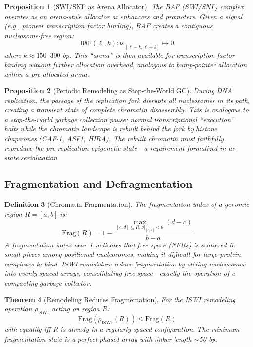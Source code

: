 \documentclass[12pt,a4paper]{article}
\newtheorem{theorem}{Theorem}[section]
\newtheorem{proposition}[theorem]{Proposition}
\newtheorem{definition}[theorem]{Definition}
\newcommand{\eg}{\textit{e.g.}}
\begin{document}
\begin{proposition}[SWI/SNF as Arena Allocator]
\label{prop:swi-snf}
The BAF (SWI/SNF) complex operates as an arena-style allocator at enhancers and promoters. Given a signal (\eg, pioneer transcription factor binding), BAF creates a contiguous nucleosome-free region:
\[
    \texttt{BAF}(\ell, k) : \nu|_{[\ell-k, \ell+k]} \mapsto 0
\]
where $k \approx 150\text{--}300$ bp. This ``arena'' is then available for transcription factor binding without further allocation overhead, analogous to bump-pointer allocation within a pre-allocated arena.
\end{proposition}

\begin{proposition}[Periodic Remodeling as Stop-the-World GC]
\label{prop:stop-world}
During DNA replication, the passage of the replication fork disrupts all nucleosomes in its path, creating a transient state of complete chromatin disassembly. This is analogous to a stop-the-world garbage collection pause: normal transcriptional ``execution'' halts while the chromatin landscape is rebuilt behind the fork by histone chaperones (CAF-1, ASF1, HIRA). The rebuilt chromatin must faithfully reproduce the pre-replication epigenetic state---a requirement formalized in  as state serialization.
\end{proposition}

\subsection{Fragmentation and Defragmentation}

\begin{definition}[Chromatin Fragmentation]
\label{def:fragmentation}
The \emph{fragmentation index} of a genomic region $R = [a, b]$ is:
\[
    \mathrm{Frag}(R) = 1 - \frac{\max_{[c,d] \subseteq R, \nu|_{[c,d]} < \theta} (d - c)}{b - a}
\]
A fragmentation index near 1 indicates that free space (NFRs) is scattered in small pieces among positioned nucleosomes, making it difficult for large protein complexes to bind. ISWI remodelers reduce fragmentation by sliding nucleosomes into evenly spaced arrays, consolidating free space---exactly the operation of a compacting garbage collector.
\end{definition}

\begin{theorem}[Remodeling Reduces Fragmentation]
\label{thm:defrag}
For the ISWI remodeling operation $\rho_{\mathrm{ISWI}}$ acting on region $R$:
\[
    \mathrm{Frag}(\rho_{\mathrm{ISWI}}(R)) \leq \mathrm{Frag}(R)
\]
with equality iff $R$ is already in a regularly spaced configuration. The minimum fragmentation state is a perfect phased array with linker length $\sim$50 bp.
\end{theorem}
\end{document}
